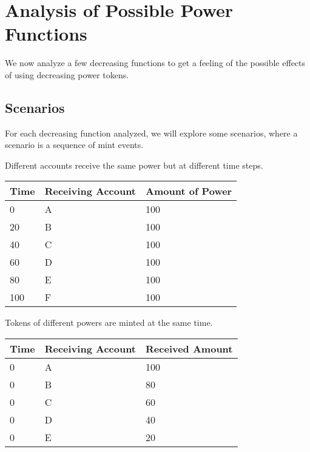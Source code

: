 \section{Analysis of Possible Power Functions}
\label{sec:analysis_of_possible_decreasing_functions}

We now analyze a few decreasing functions to get a feeling of the possible effects of using decreasing power tokens.

\subsection{Scenarios}

For each decreasing function analyzed, we will explore some scenarios, where a scenario is a sequence of mint events.

\begin{scenario}
  \label{sce:identical_power_different_time_steps}
  Different accounts receive the same power but at different time steps.

  \begin{center}
    \begin{tabular}{lll}
      \toprule
        \textbf{Time} & \textbf{Receiving Account} & \textbf{Amount of Power}\\
      \midrule
        0 & A & 100\\
        20 & B & 100\\
        40 & C & 100\\
        60 & D & 100\\
        80 & E & 100\\
        100 & F & 100\\
      \bottomrule
    \end{tabular}
  \end{center}
\end{scenario}

\begin{scenario}
  \label{sce:different_powers_identical_time_step}
  Tokens of different powers are minted at the same time.

  \begin{center}
    \begin{tabular}{lll}
      \toprule
        \textbf{Time} & \textbf{Receiving Account} & \textbf{Received Amount}\\
      \midrule
        0 & A & 100\\
        0 & B & 80\\
        0 & C & 60\\
        0 & D & 40\\
        0 & E & 20\\
      \bottomrule
    \end{tabular}
  \end{center}
\end{scenario}

